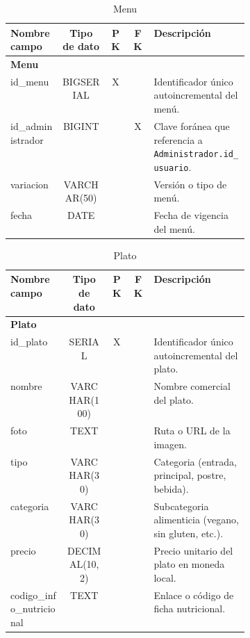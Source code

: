 \documentclass[12pt,a4paper]{article}
\begin{document}
\begin{table}[h!]
\centering
\begin{tabular}{|l|c|c|c|p{0.4\linewidth}|}
\hline
\textbf{Nombre campo}                       & \textbf{Tipo de dato}   & \textbf{PK} & \textbf{FK} & \textbf{Descripción} \\
\hline
\multicolumn{5}{|l|}{\textbf{Menu}} \\
\hline
id\_menu                                     & BIGSERIAL               & X           &             & Identificador único autoincremental del menú. \\
id\_administrador                            & BIGINT                  &             & X           & Clave foránea que referencia a \texttt{Administrador.id\_usuario}. \\
variacion                                   & VARCHAR(50)             &             &             & Versión o tipo de menú. \\
fecha                                       & DATE                    &             &             & Fecha de vigencia del menú. \\
\hline
\end{tabular}
\caption{Menu}
\label{table:menu}
\end{table}


\begin{table}[h!]
\centering
\begin{tabular}{|l|c|c|c|p{0.4\linewidth}|}
\hline
\textbf{Nombre campo}      & \textbf{Tipo de dato} & \textbf{PK} & \textbf{FK} & \textbf{Descripción} \\
\hline
\multicolumn{5}{|l|}{\textbf{Plato}} \\
\hline
id\_plato                  & SERIAL                & X           &             & Identificador único autoincremental del plato. \\
nombre                     & VARCHAR(100)          &             &             & Nombre comercial del plato. \\
foto                       & TEXT                  &             &             & Ruta o URL de la imagen. \\
tipo                       & VARCHAR(30)           &             &             & Categoria (entrada, principal, postre, bebida). \\
categoria                  & VARCHAR(30)           &             &             & Subcategoria alimenticia (vegano, sin gluten, etc.). \\
precio                     & DECIMAL(10,2)         &             &             & Precio unitario del plato en moneda local. \\
codigo\_info\_nutricional  & TEXT                  &             &             & Enlace o código de ficha nutricional. \\
\hline
\end{tabular}
\caption{Plato}
\label{table:plato}
\end{table}
\end{document}
